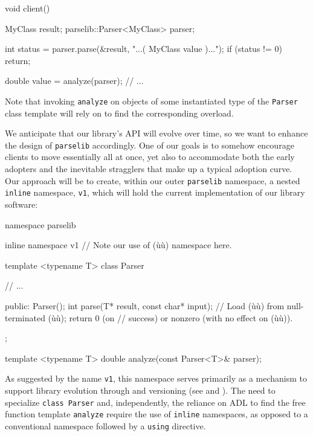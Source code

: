 \begin{emcppslisting}[emcppsbatch=e2]
void client()
{
    MyClass result;
    parselib::Parser<MyClass> parser;

    int status = parser.parse(&result, "...( MyClass value )...");
    if (status != 0)
    {
        return;
    }

    double value = analyze(parser);
    // ...
}
\end{emcppslisting}

\noindent Note that invoking \lstinline!analyze! on objects of some instantiated type
of the \lstinline!Parser! class template will rely on  to find
the corresponding overload.

We anticipate that our library's API will evolve over time, so we want to
enhance the design of \lstinline!parselib! accordingly. One of our goals is
to somehow encourage clients to move essentially all at once, yet also to
accommodate both the early adopters and the inevitable stragglers that
make up a typical adoption curve. Our approach will be to create, within
our outer \lstinline!parselib! namespace, a nested \lstinline!inline!
namespace, \lstinline!v1!, which will hold the current implementation of
our library software:

\begin{emcppslisting}[emcppsbatch=e3]
namespace parselib
{
    inline namespace v1             // Note our use of (ù{}ù) namespace here.
    {
        template <typename T>
        class Parser
        {
            // ...

        public:
            Parser();
            int parse(T* result, const char* input);
                // Load (ù{}ù) from null-terminated (ù{}ù); return 0 (on
                // success) or nonzero (with no effect on (ù{}ù)).
        };

        template <typename T>
        double analyze(const Parser<T>& parser);
    }
}
\end{emcppslisting}

\noindent As suggested by the name \lstinline!v1!, this namespace serves primarily as
a mechanism to support library evolution through  and
 versioning (see 
and  ).
The need to specialize \lstinline!class!~\lstinline!Parser! and,
independently, the reliance on ADL to find the free function template
\lstinline!analyze! require the use of \lstinline!inline! namespaces, as
opposed to a conventional namespace followed by a \lstinline!using!
directive.

